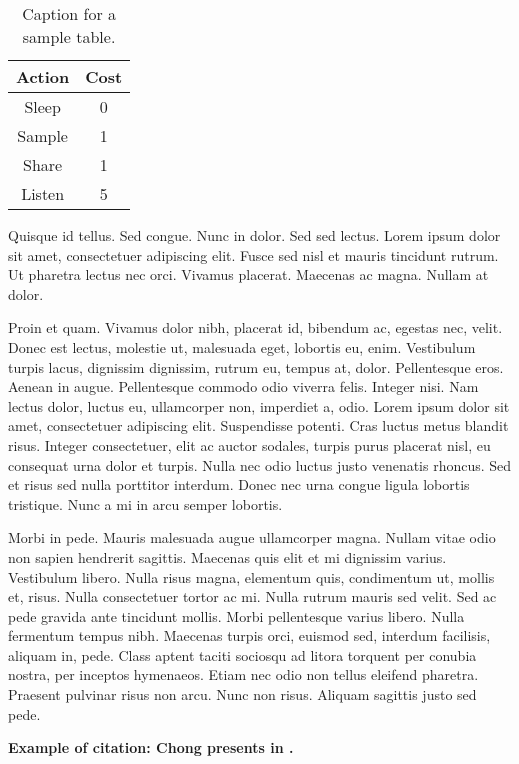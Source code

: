 \documentclass[a4paper,11pt,oneside]{report}
\begin{document}
\begin{table}
    \centering
    \caption{Caption for a sample table.}
    \begin{tabular}{c|c}
        \textbf{Action}   &   \textbf{Cost} \\
        \hline
        Sleep   &   0 \\
        Sample  &   1 \\
        Share   &   1 \\
        Listen  &   5 
    \end{tabular}
    \label{tab:sample_table}
\end{table}

Quisque id tellus. Sed congue. Nunc in dolor. Sed sed lectus. Lorem ipsum dolor
sit amet, consectetuer adipiscing elit. Fusce sed nisl et mauris tincidunt
rutrum. Ut pharetra lectus nec orci. Vivamus placerat. Maecenas ac magna. Nullam
at dolor.

Proin et quam. Vivamus dolor nibh, placerat id, bibendum ac, egestas nec, velit.
Donec est lectus, molestie ut, malesuada eget, lobortis eu, enim. Vestibulum
turpis lacus, dignissim dignissim, rutrum eu, tempus at, dolor. Pellentesque
eros. Aenean in augue. Pellentesque commodo odio viverra felis. Integer nisi.
Nam lectus dolor, luctus eu, ullamcorper non, imperdiet a, odio. Lorem ipsum
dolor sit amet, consectetuer adipiscing elit. Suspendisse potenti. Cras luctus
metus blandit risus. Integer consectetuer, elit ac auctor sodales, turpis purus
placerat nisl, eu consequat urna dolor et turpis. Nulla nec odio luctus justo
venenatis rhoncus. Sed et risus sed nulla porttitor interdum. Donec nec urna
congue ligula lobortis tristique. Nunc a mi in arcu semper lobortis.

Morbi in pede. Mauris malesuada augue ullamcorper magna. Nullam vitae odio non
sapien hendrerit sagittis. Maecenas quis elit et mi dignissim varius. Vestibulum
libero. Nulla risus magna, elementum quis, condimentum ut, mollis et, risus.
Nulla consectetuer tortor ac mi. Nulla rutrum mauris sed velit. Sed ac pede
gravida ante tincidunt mollis. Morbi pellentesque varius libero. Nulla fermentum
tempus nibh. Maecenas turpis orci, euismod sed, interdum facilisis, aliquam in,
pede. Class aptent taciti sociosqu ad litora torquent per conubia nostra, per
inceptos hymenaeos. Etiam nec odio non tellus eleifend pharetra. Praesent
pulvinar risus non arcu. Nunc non risus. Aliquam sagittis justo sed pede.

\textbf{Example of citation: Chong presents in \cite{chong2003}.}
\end{document}
